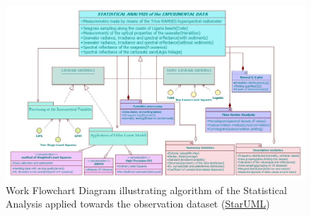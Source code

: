 \documentclass[10pt, a4paper]{article}
\begin{document}
\begin{figure}[H]
	\centering
	\includegraphics[scale=0.45, angle=90]{UML_StatAn.jpg}
	\caption{Work Flowchart Diagram illustrating algorithm of the Statistical Analysis applied towards the observation dataset (\href{http://staruml.sourceforge.net/en/}{StarUML})}
	\label{fig:34}
\end{figure}
\end{document}
